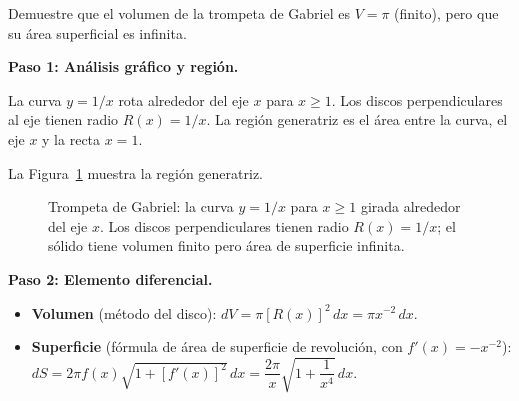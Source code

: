 \begin{example}
Demuestre que el volumen de la trompeta de Gabriel es $V=\pi$ (finito), pero que su área
superficial es infinita.
\begin{myproof}
\textbf{Paso 1: Análisis gráfico y región.}

La curva $y=1/x$ rota alrededor del eje $x$ para $x\geq 1$. Los discos perpendiculares al eje
tienen radio $R(x)=1/x$. La región generatriz es el área entre la curva, el eje $x$ y la recta
$x=1$.

La Figura~\ref{fig:trompeta_gabriel} muestra la región generatriz.

\begin{figure}[H]
\centering
{}
\caption{Trompeta de Gabriel: la curva $y=1/x$ para $x\geq 1$ girada alrededor del eje $x$. Los discos perpendiculares tienen radio $R(x)=1/x$; el sólido tiene volumen finito pero área de superficie infinita.}
\label{fig:trompeta_gabriel}
\end{figure}

\textbf{Paso 2: Elemento diferencial.}
\begin{itemize}
    \item \textbf{Volumen} (método del disco):
          $dV = \pi[R(x)]^2\,dx = \pi x^{-2}\,dx$.
    \item \textbf{Superficie} (fórmula de área de superficie de revolución, con $f'(x)=-x^{-2}$):
          $dS = 2\pi f(x)\sqrt{1+[f'(x)]^2}\,dx
              = \dfrac{2\pi}{x}\sqrt{1+\dfrac{1}{x^4}}\,dx$.
\end{itemize}


\end{myproof}
\end{example}
